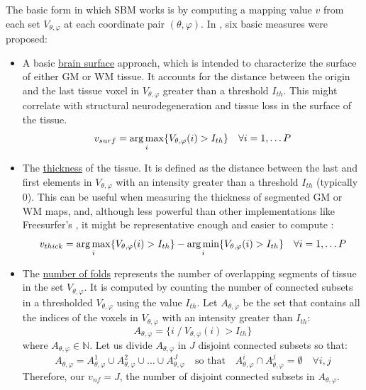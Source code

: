 The basic form in which \ac{SBM} works is by computing a mapping value $v$ from each set $V_{\theta,\varphi}$ at each coordinate pair $(\theta,\varphi)$. In \cite{Martinez-Murcia2014225,Martinez-Murcia2015}, six basic measures were proposed: 


\begin{itemize}
	\item A basic \underline{brain surface} approach, which is intended to characterize the surface of either \ac{GM} or \ac{WM} tissue. It accounts for the distance between the origin and the last tissue voxel in $V_{\theta,\varphi}$ greater than a threshold $I_{th}$. This might correlate with structural neurodegeneration and tissue loss in the surface of the tissue. 
	\begin{equation}\label{eq:surface}
	v_{surf}= \operatorname*{arg\,max}_i \lbrace V_{\theta,\varphi}(i)>I_{th}\rbrace \quad \forall i=1,\dots P
	\end{equation}  
	
	\item The \underline{thickness} of the tissue. It is defined as the distance between the last and first elements in $V_{\theta,\varphi}$
	with an intensity greater than a threshold $I_{th}$ (typically 0). This can be useful when measuring the thickness of segmented \ac{GM} or \ac{WM} maps, and, although less powerful than other implementations like Freesurfer's \cite{Dale1999}, it might be representative enough and easier to compute : 
	\begin{equation}\label{eq:thickness}
	v_{thick}=\operatorname*{arg\,max}_i \lbrace V_{\theta,\varphi}(i)>I_{th}\rbrace- \operatorname*{arg\,min}_i \lbrace V_{\theta,\varphi}(i)>I_{th}\rbrace
	\quad \forall i=1,\dots P
	\end{equation}  
	
	\item The \underline{number of folds} represents the number of overlapping segments of tissue in the set $V_{\theta,\varphi}$. It is computed by counting the number of connected subsets in a thresholded $V_{\theta,\varphi}$ using the value $I_{th}$. Let $A_{\theta,\varphi}$ be the set that contains all the indices of the voxels in $V_{\theta,\varphi}$ with an intensity greater than $I_{th}$:
	\begin{equation}
	A_{\theta,\varphi} = \lbrace i \; / \: V_{\theta,\varphi}(i)>I_{th} \rbrace
	\end{equation}
	where $A_{\theta,\varphi} \in \mathbb{N}$. Let us divide $A_{\theta,\varphi}$ in $J$ disjoint connected subsets so that:
	\begin{equation}
	A_{\theta,\varphi} = A_{\theta,\varphi}^1 \cup A_{\theta,\varphi}^2 \cup \dots \cup A_{\theta,\varphi}^J \quad \text{so that} \quad A_{\theta,\varphi}^i \cap A_{\theta,\varphi}^j = \emptyset \quad \forall i,j
	\end{equation}
	Therefore, our $v_{nf}=J$, the number of disjoint connected subsets in $A_{\theta,\varphi}$.
	

\end{itemize}
